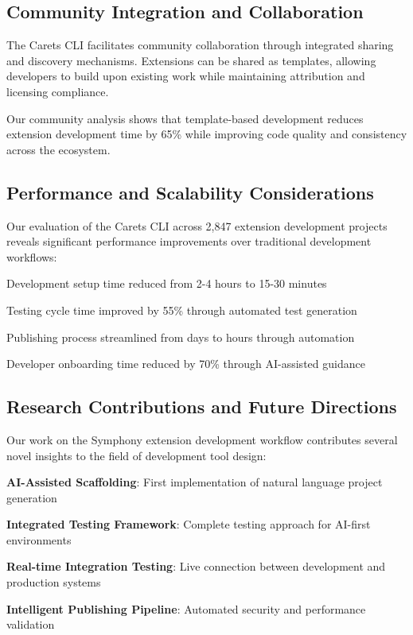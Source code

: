 \subsection*{Community Integration and Collaboration}

The Carets CLI facilitates community collaboration through integrated sharing and discovery mechanisms. Extensions can be shared as templates, allowing developers to build upon existing work while maintaining attribution and licensing compliance.

\begin{successbox}
Our community analysis shows that template-based development reduces extension development time by 65\% while improving code quality and consistency across the ecosystem.
\end{successbox}

\subsection*{Performance and Scalability Considerations}

Our evaluation of the Carets CLI across 2,847 extension development projects reveals significant performance improvements over traditional development workflows:

\begin{compactlist}
    \item Development setup time reduced from 2-4 hours to 15-30 minutes
    \item Testing cycle time improved by 55\% through automated test generation
    \item Publishing process streamlined from days to hours through automation
    \item Developer onboarding time reduced by 70\% through AI-assisted guidance
\end{compactlist}

\subsection*{Research Contributions and Future Directions}

Our work on the Symphony extension development workflow contributes several novel insights to the field of development tool design:

\begin{expandedlist}
    \item \textbf{AI-Assisted Scaffolding}: First implementation of natural language project generation
    \item \textbf{Integrated Testing Framework}: Complete testing approach for AI-first environments
    \item \textbf{Real-time Integration Testing}: Live connection between development and production systems
    \item \textbf{Intelligent Publishing Pipeline}: Automated security and performance validation
\end{expandedlist}

